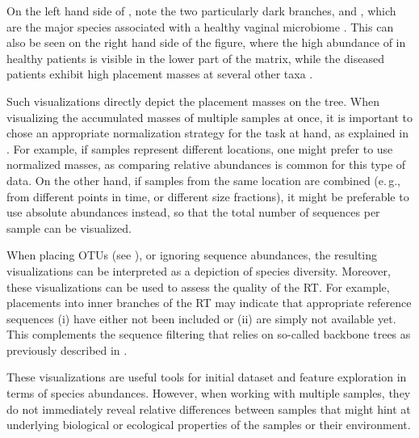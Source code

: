 On the left hand side of , note the two particularly dark branches, 
 and ,
which are the major species associated with a healthy vaginal microbiome \cite{Srinivasan2012}.
This can also be seen on the right hand side of the figure,
where the high abundance of  in healthy patients
is visible in the lower part of the matrix,
while the diseased patients exhibit high placement masses at several other taxa \cite{Srinivasan2012}.

Such visualizations directly depict the placement masses on the tree.
When visualizing the accumulated masses of multiple samples at once,
it is important to chose an appropriate normalization strategy for the task at hand,
as explained in .
For example, if samples represent different locations, one might prefer to use normalized masses,
as comparing relative abundances is common for this type of data.
On the other hand, if samples from the same location are combined
(e.\,g., from different points in time, or different size fractions),
it might be preferable to use absolute abundances instead,
so that the total number of sequences per sample can be visualized.

When placing OTUs (see ),
or ignoring sequence abundances, the resulting visualizations can be interpreted as a depiction of species diversity.
Moreover, these visualizations can be used to assess the quality of the \ac{RT}.
For example, placements into inner branches of the \ac{RT} may indicate that appropriate reference sequences
(i) have either not been included or (ii) are simply not available yet.
This complements the sequence filtering that relies on so-called backbone trees
as previously described in .

These visualizations are useful tools for initial dataset and feature exploration in terms of species abundances.
However, when working with multiple samples,
they do not immediately reveal relative differences between samples
that might hint at underlying biological or ecological properties of the samples or their environment.

